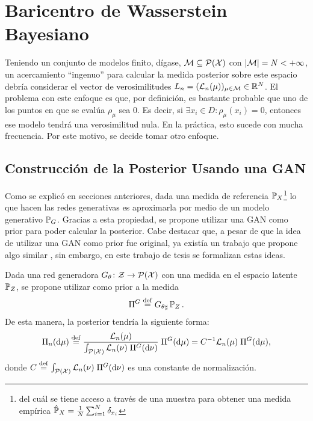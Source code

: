 \section{Baricentro de Wasserstein Bayesiano}\label{sec:bwb}  %


Teniendo un conjunto de modelos finito, dígase, $\Models \subseteq \ProbSpace[\cX] $ con $| \Models | = N < + \infty$, un acercamiento ``ingenuo'' para calcular la medida posterior sobre este espacio debría considerar el vector de verosimilitudes $L_n = (\cL_n(\mu))_{\mu \in \Models} \in \R^N$. El problema con este enfoque es que, por definición, es bastante probable que uno de los puntos en que se evalúa $\rho_\mu$ sea $0$. Es decir, si $\exists x_i \in D \colon \rho_\mu(x_i) = 0$, entonces ese modelo tendrá una verosimilitud nula. En la práctica, esto sucede con mucha frecuencia. Por este motivo, se decide tomar otro enfoque.


\subsection{Construcción de la Posterior Usando una GAN}\label{ssec:construccion-posterior}  %


Como se explicó en secciones anteriores,
dada una medida de referencia $\Prob_X$\footnote{del cuál se tiene acceso a través de una muestra para obtener una medida empírica $\hat\Prob_X = \frac{1}{N}\sum_{i=1}^{N} \delta_{x_i}$} lo que hacen las redes generativas es aproximarla por medio de un modelo generativo $\Prob_G$. Gracias a esta propiedad, se propone utilizar una GAN como prior para poder calcular la posterior. Cabe destacar que, a pesar de que la idea de utilizar una GAN como prior fue original, ya existía un trabajo que propone algo similar \cite{patel2019bayesian}, sin embargo, en este trabajo de tesis se formalizan estas ideas.

Dada una red generadora $G_\theta \colon \cZ \to \ProbSpace[\cX] $ con una medida en el espacio latente $\Prob_Z$, se propone utilizar como prior a la medida
\begin{equation}
    \Pi^G \eqdef \pf{G_\theta} \Prob_Z.
\end{equation}
De esta manera, la posterior tendría la siguiente forma:
\begin{equation}
    \Pi_n(\dd \mu)
    \eqdef \frac{\cL_n(\mu)}{\int_{\ProbSpace[\cX]} \cL_n(\nu) \; \Pi^G(\dd \nu)} \; \Pi^G(\dd \mu)
    = C^{-1} \cL_n(\mu) \; \Pi^G(\dd \mu),
\end{equation}
donde $C \eqdef \int_{\ProbSpace[\cX]} \cL_n(\nu) \; \Pi^G(\dd \nu)$ es una constante de normalización.

